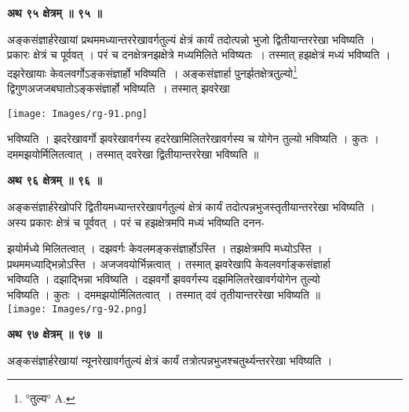 \documentclass[11pt, openany]{book}
\begin{document}
\newpage
\begin{center} 
\textbf{\large अथ ९५ क्षेत्रम् ॥ ९५ ॥}
\end{center}

{\ab अङ्कसंज्ञार्हरेखायां प्रथममध्यान्तररेखावर्गतुल्यं क्षेत्रं कार्यं
तदोत्पन्नो भुजो द्वितीयान्तररेखा भविष्यति ।}\\

प्रकारः क्षेत्रं च पूर्ववत् । परं च दनक्षेत्रनझक्षेत्रे
मध्यमिलिते भविष्यतः~। तस्मात् हझक्षेत्रं मध्यं भविष्यति । दझरेखायाः केवलवर्गोऽङ्कसंज्ञार्हो भविष्यति~। अङ्कसंज्ञार्हा  पुनर्झतक्षेत्रतुल्यो\renewcommand{\thefootnote}{१}\footnote{°तुल्य° {\en A.}} द्विगुणअजजबघातोऽङ्कसंज्ञार्हो  भविष्यति~। तस्मात् झवरेखा 
\begin{center}
\texttt{[image: Images/rg-91.png]}\\
\end{center}
भविष्यति । झदरेखावर्गो झवरेखावर्गस्य हदरेखामिलितरेखावर्गस्य च योगेन तुल्यो भविष्यति । कुतः । दममझयोर्मिलितत्वात् । तस्मात् दवरेखा द्वितीयान्तररेखा भविष्यति ॥\\
\begin{center}
\textbf{\large अथ ९६ क्षेत्रम् ॥ ९६ ॥}
\end{center}

{\ab अङ्कसंज्ञार्हरेखोपरि द्वितीयमध्यान्तररेखावर्गतुल्यं क्षेत्रं
कार्यं तदोत्पन्नभुजस्तृतीयान्तररेखा भविष्यति ।}\\

 अस्य प्रकारः क्षेत्रं च पूर्ववत् । परं च हझक्षेत्रमपि मध्यं भविष्यति दनन-
\begin{vwcol}[widths={0.65,0.35}, sep=.8cm, rule=0pt]
झयोर्मध्ये मिलितत्वात् । दझवर्गः केवलमङ्कसंज्ञार्होऽस्ति । तझक्षेत्रमपि मध्योऽस्ति ।
प्रथममध्याद्भिन्नोऽस्ति । अजजवयोर्भिन्नत्वात् । तस्मात् झवरेखापि केवलवर्गाङ्कसंज्ञार्हा\\ \noindent  भविष्यति । दझाद्भिन्ना भविष्यति । दझवर्गो झववर्गस्य दझमिलितरेखावर्गयोगेन तुल्यो\\ \noindent  भविष्यति । कुतः । दममझयोर्मिलितत्वात्~। तस्मात्  दवं तृतीयान्तररेखा भविष्यति ॥ \\
\noindent \texttt{[image: Images/rg-92.png]}
\end{vwcol}
\vspace{-4mm}

\newpage
\begin{center} 
\textbf{\large अथ ९७ क्षेत्रम् ॥ ९७ ॥}
\end{center}
\vspace{5mm}

{\ab अङ्कसंज्ञार्हरेखायां न्यूनरेखावर्गतुल्यं क्षेत्रं कार्यं तत्रोत्पन्नभुजश्चतुर्थ्यन्तररेखा भविष्यति । }\\
\end{document}
